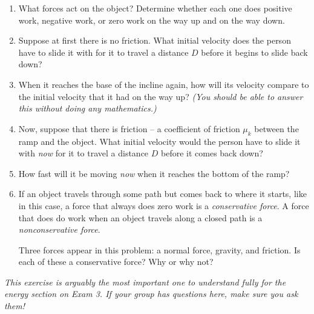\documentclass[12pt]{article}
\begin{document}
\begin{enumerate}

\item What forces act on the object? Determine whether each one does positive work, negative work, or zero work on the way up and on the way down.

\vspace{2in}

\item	Suppose at first there is no friction. What initial velocity does the person have to slide it with for it to travel a distance $D$ before it begins to slide back down? 

\vspace{2.5in}

\item	When it reaches the base of the incline again, how will its velocity compare to the initial velocity that it had on the way up? {\it (You should be able to answer this without doing any mathematics.)}

\vspace{2in}

\newpage

\item	Now, suppose that there is friction -- a coefficient of friction $\mu_k$ between the ramp and the object. 
What initial velocity would the person have to slide it with {\it now} for it to travel a distance $D$ before it comes back down?

\vspace{3in}


\item How fast will it be moving {\it now} when it reaches the bottom of the ramp? 

\vspace{3.7in}

\item If an object travels through some path but comes back to where it starts, like in this case, a force that always does zero work is a {\it conservative force}. A force that does do work when an object travels along a closed path is a {\it nonconservative force}.

Three forces appear in this problem: a normal force, gravity, and friction. Is each of these a conservative force? Why or why not?

\end{enumerate}
\newpage

\begin{center}
	\it This exercise is arguably the most important one to understand fully for the energy section on Exam 3. If your group has questions here, make sure you ask them!
\end{center}
\end{document}
